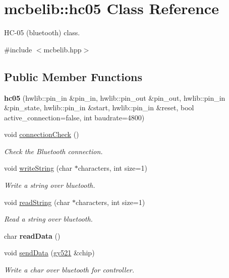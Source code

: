 \hypertarget{classmcbelib_1_1hc05}{}\section{mcbelib\+:\+:hc05 Class Reference}
\label{classmcbelib_1_1hc05}


H\+C-\/05 (bluetooth) class.  




{\ttfamily \#include $<$mcbelib.\+hpp$>$}

\subsection*{Public Member Functions}
\begin{DoxyCompactItemize}
\item 
\mbox{\label{classmcbelib_1_1hc05_a9b8b3ebb03d63ad2857a789b97c2577e}} 
{\bfseries hc05} (hwlib\+::pin\+\_\+in \&pin\+\_\+in, hwlib\+::pin\+\_\+out \&pin\+\_\+out, hwlib\+::pin\+\_\+in \&pin\+\_\+state, hwlib\+::pin\+\_\+in \&start, hwlib\+::pin\+\_\+in \&reset, bool active\+\_\+connection=false, int baudrate=4800)
\item 
void \hyperlink{classmcbelib_1_1hc05_a48d294a72ba90a9cd6573da553fc7823}{connection\+Check} ()
\begin{DoxyCompactList}\small\item\em Check the Bluetooth connection. \end{DoxyCompactList}\item 
void \hyperlink{classmcbelib_1_1hc05_a3cd0be8d16a5eb990216b41e533b815c}{write\+String} (char $\ast$characters, int size=1)
\begin{DoxyCompactList}\small\item\em Write a string over bluetooth. \end{DoxyCompactList}\item 
void \hyperlink{classmcbelib_1_1hc05_a4786907ca61b495eb7a7453f8787286e}{read\+String} (char $\ast$characters, int size=1)
\begin{DoxyCompactList}\small\item\em Read a string over bluetooth. \end{DoxyCompactList}\item 
\mbox{\label{classmcbelib_1_1hc05_a718bad3e6b82582a0eb4ba5ca036b361}} 
char {\bfseries read\+Data} ()
\item 
void \hyperlink{classmcbelib_1_1hc05_ab8e13647d668978bd77654b39572008d}{send\+Data} (\hyperlink{classmcbelib_1_1gy521}{gy521} \&chip)
\begin{DoxyCompactList}\small\item\em Write a char over bluetooth for controller. \end{DoxyCompactList}\end{DoxyCompactItemize}



